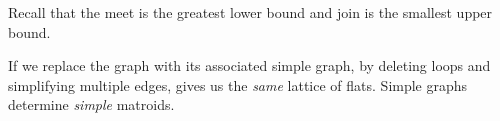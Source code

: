 \documentclass[12pt]{memoir}
\begin{document}
Recall that the meet is the greatest lower bound and join is the smallest upper bound.\par 
If we replace the graph with its associated simple graph, by deleting loops and simplifying multiple edges, gives us the \emph{same} lattice of flats. Simple graphs determine \emph{simple} matroids. 
\ifx\nextra\undefined
\printindex
\else\fi
\nocite{*}


\end{document}
